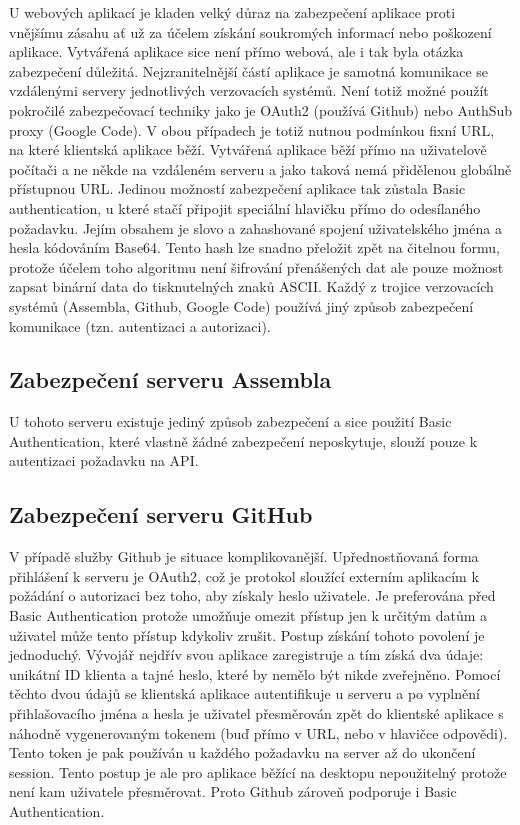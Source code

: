 U webových aplikací je kladen velký důraz na zabezpečení aplikace proti vnějšímu zásahu ať už za účelem získání soukromých informací nebo poškození aplikace. Vytvářená aplikace sice není přímo webová, ale i tak byla otázka zabezpečení důležitá. Nejzranitelnější částí aplikace je samotná komunikace se vzdálenými servery jednotlivých verzovacích systémů. Není totiž možné použít pokročilé zabezpečovací techniky jako je OAuth2 (používá Github) nebo AuthSub proxy (Google Code). V obou případech je totiž nutnou podmínkou fixní URL, na které klientská aplikace běží. Vytvářená aplikace běží přímo na uživatelově počítači a ne někde na vzdáleném serveru a jako taková nemá přidělenou globálně přístupnou URL. Jedinou možností zabezpečení aplikace tak zůstala Basic authentication, u které stačí připojit speciální hlavičku  přímo do odesílaného požadavku. Jejím obsahem je slovo  a zahashované spojení uživatelského jména a hesla kódováním Base64. Tento hash lze snadno přeložit zpět na čitelnou formu, protože účelem toho algoritmu není šifrování přenášených dat ale pouze možnost zapsat binární data do tisknutelných znaků ASCII. Každý z trojice verzovacích systémů (Assembla, Github, Google Code) používá jiný způsob zabezpečení komunikace (tzn. autentizaci a autorizaci). 

\subsection{Zabezpečení serveru Assembla}

U tohoto serveru existuje jediný způsob zabezpečení a sice použití Basic Authentication, které vlastně žádné zabezpečení neposkytuje, slouží pouze k autentizaci požadavku na API.

\subsection{Zabezpečení serveru GitHub}

V případě služby Github je situace komplikovanější. Upřednostňovaná forma přihlášení k serveru je OAuth2, což je protokol sloužící externím aplikacím k požádání o autorizaci bez toho, aby získaly heslo uživatele. Je preferována před Basic Authentication protože umožňuje omezit přístup jen k určitým datům a uživatel může tento přístup kdykoliv zrušit. Postup získání tohoto povolení je jednoduchý. Vývojář nejdřív svou aplikace zaregistruje a tím získá dva údaje: unikátní ID klienta a tajné heslo, které by nemělo být nikde zveřejněno. Pomocí těchto dvou údajů se klientská aplikace autentifikuje u serveru a po vyplnění přihlašovacího jména a hesla je uživatel přesměrován zpět do klientské aplikace s náhodně vygenerovaným tokenem (buď přímo v URL, nebo v hlavičce odpovědi). Tento token je pak používán u každého požadavku na server až do ukončení session. Tento postup je ale pro aplikace běžící na desktopu nepoužitelný protože není kam uživatele přesměrovat. Proto Github zároveň podporuje i Basic Authentication.

